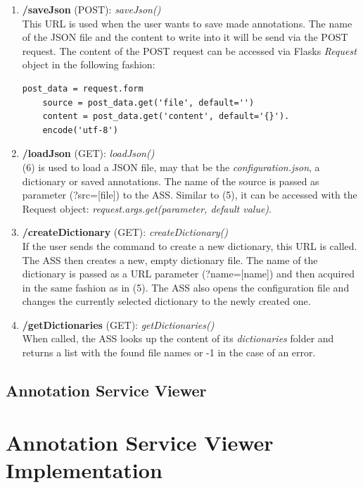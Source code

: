 \begin{enumerate}[(1) -]
	\item \textbf{/saveJson} (POST): \emph{saveJson()}\\
	This URL is used when the user wants to save made annotations. The name of the JSON file and the content to write into it will be send via the POST request. The content of the POST request can be accessed via Flasks \emph{Request} object\cite{web:flask} in the following fashion:
	\begin{lstlisting}[frame=single]
	post_data = request.form
	source = post_data.get('file', default='')
	content = post_data.get('content', default='{}').
	encode('utf-8')
	\end{lstlisting}
	
	\item \textbf{/loadJson} (GET): \emph{loadJson()}\\
	(6) is used to load a JSON file, may that be the \emph{configuration.json}, a dictionary or saved annotations. The name of the source is passed as parameter (?src=[file]) to the ASS. Similar to (5), it can be accessed with the Request object\cite{web:flask}: \emph{request.args.get(parameter, default value)}.
	
	\item \textbf{/createDictionary} (GET): \emph{createDictionary()}\\
	If the user sends the command to create a new dictionary, this URL is called. The ASS then creates a new, empty dictionary file. The name of the dictionary is passed as a URL parameter (?name=[name]) and then acquired in the same fashion as in (5). The ASS also opens the configuration file and changes the currently selected dictionary to the newly created one.
	
	\item \textbf{/getDictionaries} (GET): \emph{getDictionaries()}\\
	When called, the ASS looks up the content of its \emph{dictionaries} folder and returns a list with the found file names or -1 in the case of an error.
\end{enumerate}



\subsection{Annotation Service Viewer}

\section{Annotation Service Viewer Implementation}
